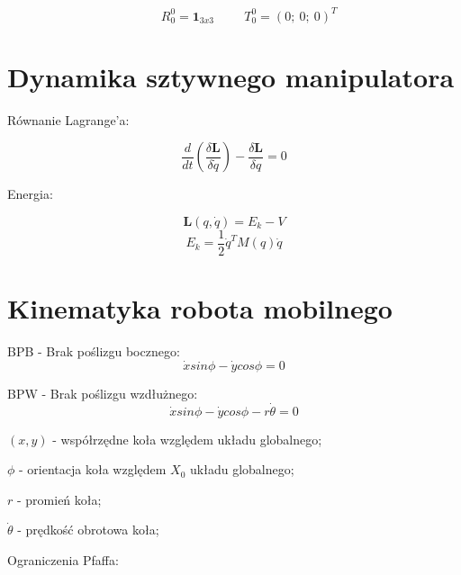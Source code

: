 \documentclass{article}
\newenvironment{kol2}{\noindent \begin{minipage}[t]{0.5\linewidth}}{\end{minipage}}
\begin{document}
\large
$$  \hspace{1cm}
    R_0^0 = \textbf{1}_{3x3}
    \hspace{1cm}
    T_0^0 = ( 0;\ 0;\ 0 )^T
$$
\normalsize


\section{Dynamika sztywnego manipulatora}

\begin{kol2}
    Równanie Lagrange'a:

    \Large
    $$ \frac{d}{dt} \left( \frac{\delta \textbf{L}}{\delta \dot{q}} \right) - \frac{\delta \textbf{L}}{\delta q} = 0 $$
    \normalsize
\end{kol2}
\begin{kol2}
    Energia:

    \Large
    $$ \textbf{L}(q,\dot{q}) = E_k - V $$
    $$ E_k = \frac12 \dot{q}^T M(q) \dot{q} $$
    \normalsize
\end{kol2}

\section{Kinematyka robota mobilnego}

\begin{kol2}
    BPB - Brak poślizgu bocznego:
    \Large
    $$ \dot{x} sin \phi - \dot{y} cos \phi = 0 $$
    \normalsize
\end{kol2}
\begin{kol2}
    BPW - Brak poślizgu wzdłużnego:
    \Large
    $$ \dot{x} sin \phi - \dot{y} cos \phi - r \dot{\theta} = 0 $$
    \normalsize
\end{kol2}

\vspace{0.5cm}
\large
$(x,y)$ - współrzędne koła względem układu globalnego;

$\phi$ - orientacja koła względem $X_0$ układu globalnego;

$r$ - promień koła;

$\dot{\theta}$ - prędkość obrotowa koła;
\normalsize

\vspace{0.5cm}
\noindent
Ograniczenia Pfaffa:
\end{document}

